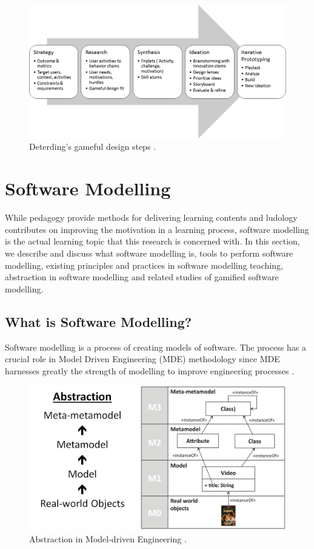 \documentclass[12pt, a4paper]{report}
\begin{document}
{\begin{figure}[ht]
\centering
\includegraphics[width=12cm]{gameful-steps}
\caption{Deterding's gameful design steps \cite{deterding2015lens}.}
\label{fig:gameful-steps}
\end{figure}


\section{Software Modelling}
While pedagogy provide methods for delivering learning contents and ludology contributes on improving the motivation in a learning process, software modelling is the actual learning topic that this research is concerned with. In this section, we describe and discuss what software modelling is, tools to perform software modelling, existing principles and practices in software modelling teaching, abstraction in software modelling and related studies of gamified software modelling.    

\subsection{What is Software Modelling?}
Software modelling is a process of creating models of software. The process has a crucial role in Model Driven Engineering (MDE) methodology since MDE harnesses greatly the strength of modelling to improve engineering processes \cite{brambilla2012model}.  

\begin{figure}[ht]
\centering
\includegraphics[width=13cm]{abstraction}
\caption{Abstraction in Model-driven Engineering \cite{brambilla2012model}.}
\label{abstraction}
\end{figure}

}
\end{document}
